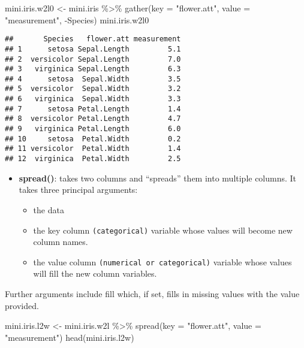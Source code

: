 \documentclass[
]{article}
\newenvironment{Shaded}{\begin{snugshade}}{\end{snugshade}}
\newcommand{\AttributeTok}[1]{\textcolor[rgb]{0.77,0.63,0.00}{#1}}
\newcommand{\FunctionTok}[1]{\textcolor[rgb]{0.00,0.00,0.00}{#1}}
\newcommand{\NormalTok}[1]{#1}
\newcommand{\OtherTok}[1]{\textcolor[rgb]{0.56,0.35,0.01}{#1}}
\newcommand{\SpecialCharTok}[1]{\textcolor[rgb]{0.00,0.00,0.00}{#1}}
\newcommand{\StringTok}[1]{\textcolor[rgb]{0.31,0.60,0.02}{#1}}
\providecommand{\tightlist}{%
  \setlength{\itemsep}{0pt}\setlength{\parskip}{0pt}}
\begin{document}
\begin{Shaded}
\begin{Highlighting}[]
\NormalTok{mini.iris.w2l0 }\OtherTok{\textless{}{-}}\NormalTok{ mini.iris }\SpecialCharTok{\%\textgreater{}\%}
          \FunctionTok{gather}\NormalTok{(}\AttributeTok{key =} \StringTok{"flower.att"}\NormalTok{, }\AttributeTok{value =} \StringTok{"measurement"}\NormalTok{, }\SpecialCharTok{{-}}\NormalTok{Species)}
\NormalTok{mini.iris.w2l0}
\end{Highlighting}
\end{Shaded}

\begin{verbatim}
##       Species   flower.att measurement
## 1      setosa Sepal.Length         5.1
## 2  versicolor Sepal.Length         7.0
## 3   virginica Sepal.Length         6.3
## 4      setosa  Sepal.Width         3.5
## 5  versicolor  Sepal.Width         3.2
## 6   virginica  Sepal.Width         3.3
## 7      setosa Petal.Length         1.4
## 8  versicolor Petal.Length         4.7
## 9   virginica Petal.Length         6.0
## 10     setosa  Petal.Width         0.2
## 11 versicolor  Petal.Width         1.4
## 12  virginica  Petal.Width         2.5
\end{verbatim}

\begin{itemize}
\item
  \textbf{spread()}: takes two columns and ``spreads'' them into
  multiple columns. It takes three principal arguments:

  \begin{itemize}
  \tightlist
  \item
    the data
  \item
    the key column \texttt{(categorical)} variable whose values will
    become new column names.
  \item
    the value column \texttt{(numerical\ or\ categorical)} variable
    whose values will fill the new column variables.
  \end{itemize}
\end{itemize}

Further arguments include fill which, if set, fills in missing values
with the value provided.

\begin{Shaded}
\begin{Highlighting}[]
\NormalTok{mini.iris.l2w }\OtherTok{\textless{}{-}}\NormalTok{ mini.iris.w2l }\SpecialCharTok{\%\textgreater{}\%}
  \FunctionTok{spread}\NormalTok{(}\AttributeTok{key =} \StringTok{"flower.att"}\NormalTok{, }\AttributeTok{value =} \StringTok{"measurement"}\NormalTok{)}
\FunctionTok{head}\NormalTok{(mini.iris.l2w)}
\end{Highlighting}
\end{Shaded}
\end{document}
